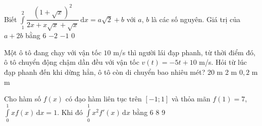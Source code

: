 \begin{ex}%
Biết $\displaystyle\int\limits_1^2 \dfrac{\left(1+\sqrt{x}\right)^2}{2x+x\sqrt{x}+\sqrt{x}}\mathrm{\,d}x = a\sqrt{2}+b$ với $a$, $b$ là các số nguyên. Giá trị của $a+2b$ bằng
\choice
{6}
{\True $-2$}
{$-1$}
{ 0}
\end{ex}

\begin{ex}%
Một ô tô đang chạy với vận tốc $10$ m/s thì người lái đạp phanh, từ thời điểm đó, ô tô chuyển động chậm dần đều với vận tốc $v(t)=-5t+10$ m/s. Hỏi từ lúc đạp phanh đến khi dừng hẳn, ô tô còn di chuyển bao nhiêu mét?
\choice
{20 m}
{2 m}
{$0{,}2$ m}
{ m}
\end{ex}

\begin{ex}%
Cho hàm số $f(x)$ có đạo hàm liên tục trên $[-1;1]$ và thỏa mãn $f(1)=7$, $\displaystyle\int\limits_0^1 xf(x)\mathrm{\,d}x =1$. Khi đó $\displaystyle\int\limits_0^1 x^2f'(x)\mathrm{\,d}x$ bằng
\choice
{6}
{8}
{}
{9}
\end{ex}

